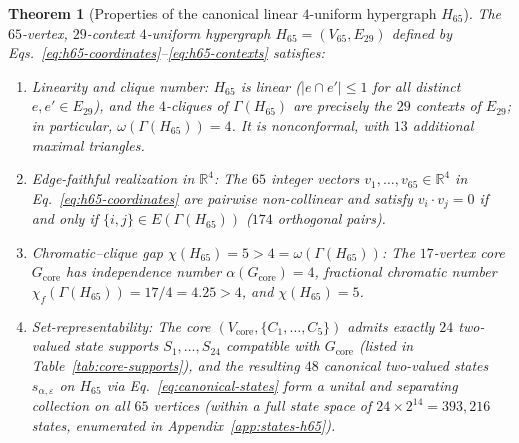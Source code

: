 \documentclass[
  aps,
  pra,
  reprint,
  superscriptaddress,
  amsmath,
  amssymb,
  nofootinbib,
  floatfix
]{revtex4-2}
\newtheorem{theorem}{Theorem}
\theoremstyle{definition}
\theoremstyle{remark}
\newcommand{\R}{\mathbb{R}}
\begin{document}
\begin{theorem}[Properties of the canonical linear $4$-uniform hypergraph $H_{65}$]\label{thm:h65}
The $65$-vertex, $29$-context $4$-uniform hypergraph $H_{65}=(V_{65},E_{29})$ defined by Eqs.~\eqref{eq:h65-coordinates}--\eqref{eq:h65-contexts} satisfies:
\begin{enumerate}
\item \emph{Linearity and clique number:} $H_{65}$ is linear ($|e\cap e'|\le1$ for all distinct $e,e'\in E_{29}$), and the $4$-cliques of $\Gamma(H_{65})$ are precisely the $29$ contexts of $E_{29}$; in particular, $\omega(\Gamma(H_{65}))=4$. It is nonconformal, with $13$ additional maximal triangles.
\item \emph{Edge-faithful realization in $\R^4$:} The $65$ integer vectors $v_1,\ldots,v_{65}\in\R^4$ in Eq.~\eqref{eq:h65-coordinates} are pairwise non-collinear and satisfy $v_i\cdot v_j=0$ if and only if $\{i,j\}\in E(\Gamma(H_{65}))$ ($174$ orthogonal pairs).
\item \emph{Chromatic--clique gap $\chi(H_{65})=5>4=\omega(\Gamma(H_{65}))$:} The $17$-vertex core $G_{\mathrm{core}}$ has independence number $\alpha(G_{\mathrm{core}})=4$, fractional chromatic number $\chi_f(\Gamma(H_{65}))=17/4=4.25>4$, and $\chi(H_{65})=5$.
\item \emph{Set-representability:} The core $(V_{\mathrm{core}},\{C_1,\ldots,C_5\})$ admits exactly $24$ two-valued state supports $S_1,\ldots,S_{24}$ compatible with $G_{\mathrm{core}}$ (listed in Table~\ref{tab:core-supports}), and the resulting $48$ canonical two-valued states $s_{\alpha,\varepsilon}$ on $H_{65}$ via Eq.~\eqref{eq:canonical-states} form a unital and separating collection on all $65$ vertices (within a full state space of $24\times 2^{14}=393{,}216$ states, enumerated in Appendix~\ref{app:states-h65}).
\end{enumerate}
\end{theorem}
\end{document}
